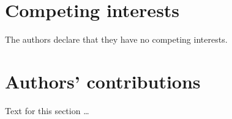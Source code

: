 \documentclass[doublespacing,linenumbers]{bmcart}
\begin{document}
\begin{backmatter}
        \section*{Competing interests}
        The authors declare that they have no competing interests.


        \section*{Authors' contributions}
        Text for this section \ldots






\end{backmatter}
\end{document}
